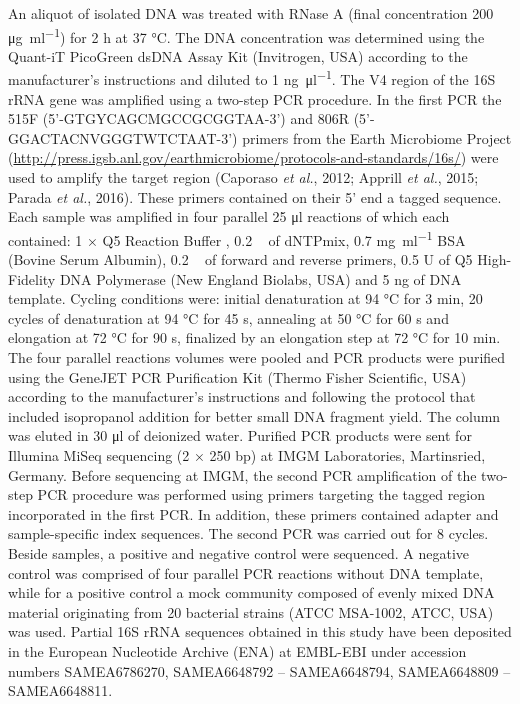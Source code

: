 \documentclass[
  12pt,
]{article}
\begin{document}
An aliquot of isolated DNA was treated with RNase A (final concentration
200 \si{\ug\per\ml}) for 2 \si{\hour} at 37 \si{\degreeCelsius}. The DNA
concentration was determined using the Quant-iT PicoGreen dsDNA Assay
Kit (Invitrogen, USA) according to the manufacturer's instructions and
diluted to 1 \si{\ng\per\ul}. The V4 region of the 16S rRNA gene was
amplified using a two-step PCR procedure. In the first PCR the 515F
(5'-GTGYCAGCMGCCGCGGTAA-3') and 806R (5'-GGACTACNVGGGTWTCTAAT-3')
primers from the Earth Microbiome Project
(\url{http://press.igsb.anl.gov/earthmicrobiome/protocols-and-standards/16s/})
were used to amplify the target region (Caporaso \emph{et al.}, 2012;
Apprill \emph{et al.}, 2015; Parada \emph{et al.}, 2016). These primers
contained on their 5' end a tagged sequence. Each sample was amplified
in four parallel 25 \si{\ul} reactions of which each contained: 1 × Q5
Reaction Buffer , 0.2 \si{\milli\Molar} of dNTPmix, 0.7 \si{\mg\per\ml}
BSA (Bovine Serum Albumin), 0.2 \si{\micro\Molar} of forward and reverse
primers, 0.5 U of Q5 High-Fidelity DNA Polymerase (New England Biolabs,
USA) and 5 \si{\ng} of DNA template. Cycling conditions were: initial
denaturation at 94 \si{\degreeCelsius} for 3 \si{\minute}, 20 cycles of
denaturation at 94 \si{\degreeCelsius} for 45 \si{\s}, annealing at 50
\si{\degreeCelsius} for 60 \si{\s} and elongation at 72
\si{\degreeCelsius} for 90 \si{\s}, finalized by an elongation step at
72 \si{\degreeCelsius} for 10 \si{\minute}. The four parallel reactions
volumes were pooled and PCR products were purified using the GeneJET PCR
Purification Kit (Thermo Fisher Scientific, USA) according to the
manufacturer's instructions and following the protocol that included
isopropanol addition for better small DNA fragment yield. The column was
eluted in 30 \si{\ul} of deionized water. Purified PCR products were
sent for Illumina MiSeq sequencing (2 × 250 bp) at IMGM Laboratories,
Martinsried, Germany. Before sequencing at IMGM, the second PCR
amplification of the two-step PCR procedure was performed using primers
targeting the tagged region incorporated in the first PCR. In addition,
these primers contained adapter and sample-specific index sequences. The
second PCR was carried out for 8 cycles. Beside samples, a positive and
negative control were sequenced. A negative control was comprised of
four parallel PCR reactions without DNA template, while for a positive
control a mock community composed of evenly mixed DNA material
originating from 20 bacterial strains (ATCC MSA-1002, ATCC, USA) was
used. Partial 16S rRNA sequences obtained in this study have been
deposited in the European Nucleotide Archive (ENA) at EMBL-EBI under
accession numbers SAMEA6786270, SAMEA6648792 -- SAMEA6648794,
SAMEA6648809 -- SAMEA6648811.
\end{document}
